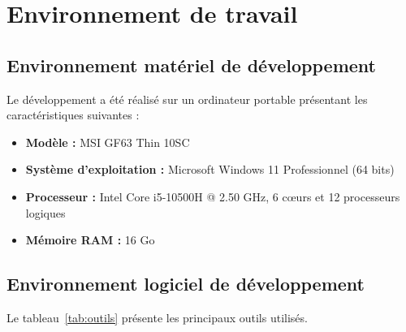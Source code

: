 \section{Environnement de travail}
\subsection{Environnement matériel de développement}
Le développement a été réalisé sur un ordinateur portable présentant les caractéristiques suivantes :
\begin{itemize}
    \item \textbf{Modèle :} MSI GF63 Thin 10SC
    \item \textbf{Système d'exploitation :} Microsoft Windows 11 Professionnel (64 bits)
    \item \textbf{Processeur :} Intel Core i5-10500H @ 2.50 GHz, 6 cœurs et 12 processeurs logiques
    \item \textbf{Mémoire RAM :} 16 Go
   
\end{itemize}

\subsection{Environnement logiciel de développement}

Le tableau~\ref{tab:outils} présente les principaux outils utilisés.

\vspace{0.3em}

